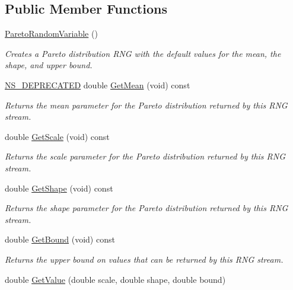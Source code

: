 \subsection*{Public Member Functions}
\begin{DoxyCompactItemize}
\item 
\hyperlink{classns3_1_1ParetoRandomVariable_a382e7b2687861ed6dd5e25ddea67d69f}{Pareto\+Random\+Variable} ()
\begin{DoxyCompactList}\small\item\em Creates a Pareto distribution R\+NG with the default values for the mean, the shape, and upper bound. \end{DoxyCompactList}\item 
\hyperlink{deprecated_8h_a771fbc06c05c32655c757f56492d98c5}{N\+S\+\_\+\+D\+E\+P\+R\+E\+C\+A\+T\+ED} double \hyperlink{classns3_1_1ParetoRandomVariable_a2e425103905e2772d98d2bbc6c32a0b3}{Get\+Mean} (void) const 
\begin{DoxyCompactList}\small\item\em Returns the mean parameter for the Pareto distribution returned by this R\+NG stream. \end{DoxyCompactList}\item 
double \hyperlink{classns3_1_1ParetoRandomVariable_a32665fbfd8fb7d1aba7fe6c5ab172bdb}{Get\+Scale} (void) const 
\begin{DoxyCompactList}\small\item\em Returns the scale parameter for the Pareto distribution returned by this R\+NG stream. \end{DoxyCompactList}\item 
double \hyperlink{classns3_1_1ParetoRandomVariable_a346c46dc10697f4128eade7eab0e737d}{Get\+Shape} (void) const 
\begin{DoxyCompactList}\small\item\em Returns the shape parameter for the Pareto distribution returned by this R\+NG stream. \end{DoxyCompactList}\item 
double \hyperlink{classns3_1_1ParetoRandomVariable_afee493e22a788ffcce342606fdf566b8}{Get\+Bound} (void) const 
\begin{DoxyCompactList}\small\item\em Returns the upper bound on values that can be returned by this R\+NG stream. \end{DoxyCompactList}\item 
double \hyperlink{classns3_1_1ParetoRandomVariable_a382e896b56412a86d009c4ec6140c2c5}{Get\+Value} (double scale, double shape, double bound)

\end{DoxyCompactItemize}
